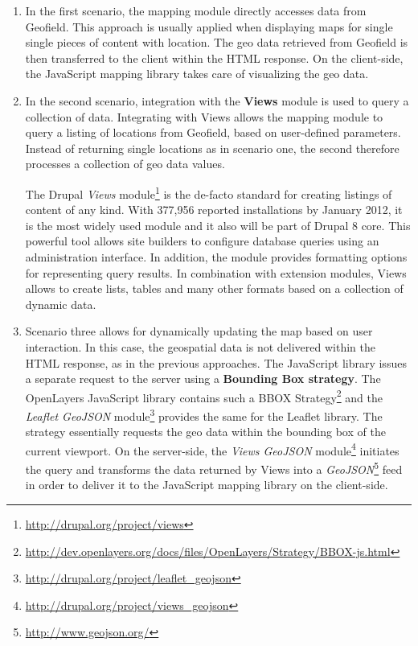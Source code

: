 \begin{enumerate}

\item In the first scenario, the mapping module directly accesses data from Geofield. This approach is usually applied when displaying maps for single single pieces of content with location. The geo data retrieved from Geofield is then transferred to the client within the HTML response. On the client-side, the JavaScript mapping library takes care of visualizing the geo data.

\item In the second scenario, integration with the \textbf{Views} module is used to query a collection of data. Integrating with Views allows the mapping module to query a listing of locations from Geofield, based on user-defined parameters. Instead of returning single locations as in scenario one, the second therefore processes a collection of geo data values.

The Drupal \textit{Views} module\footnote{\url{http://drupal.org/project/views}} is the de-facto standard for creating listings of content of any kind. With 377,956 reported installations by January 2012, it is the most widely used module and it also will be part of Drupal 8 core. This powerful tool allows site builders to configure database queries using an administration interface. In addition, the module provides formatting options for representing query results. In combination with extension modules, Views allows to create lists, tables and many other formats based on a collection of dynamic data.  

\item Scenario three allows for dynamically updating the map based on user interaction. In this case, the geospatial data is not delivered within the HTML response, as in the previous approaches. The JavaScript library issues a separate request to the server using a \textbf{Bounding Box strategy}. The OpenLayers JavaScript library contains such a BBOX Strategy\footnote{\url{http://dev.openlayers.org/docs/files/OpenLayers/Strategy/BBOX-js.html}} and the \textit{Leaflet GeoJSON} module\footnote{\url{http://drupal.org/project/leaflet_geojson}} provides the same for the Leaflet library. The strategy essentially requests the geo data within the bounding box of the current viewport. On the server-side, the \textit{Views GeoJSON} module\footnote{\url{http://drupal.org/project/views_geojson}} initiates the query and transforms the data returned by Views into a \textit{GeoJSON}\footnote{\url{http://www.geojson.org/}} feed in order to deliver it to the JavaScript mapping library on the client-side.

\end{enumerate}

